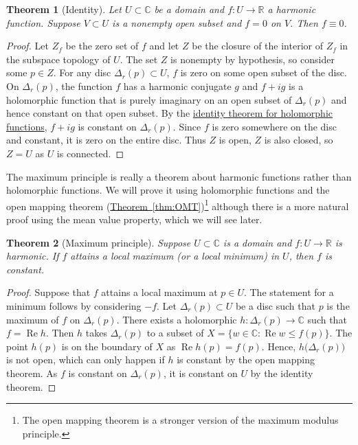\documentclass[12pt,openany]{book}
\renewcommand{\Re}{\operatorname{Re}}
\newcommand{\C}{{\mathbb{C}}}
\newcommand{\R}{{\mathbb{R}}}
\theoremstyle{plain}
\newtheorem{thm}{Theorem}[section]
\theoremstyle{remark}
\theoremstyle{definition}
\theoremstyle{exercise}
\theoremstyle{example}
\newcommand{\thmref}[1]{\hyperref[#1]{Theorem~\ref*{#1}}}
\begin{document}
\begin{thm}[Identity]
Let $U \subset \C$ be a domain and $f \colon U \to \R$ a harmonic function.
Suppose $V \subset U$ is a nonempty open subset and $f = 0$ on $V$.  Then $f
\equiv 0$.
\end{thm}

\begin{proof}
Let $Z_f$ be the zero set of $f$ and let $Z$ be the closure of the interior
of $Z_f$ in the subspace topology of $U$.
The set $Z$ is nonempty by hypothesis, so
consider some $p \in Z$.  For any disc $\Delta_r(p) \subset U$, $f$ is
zero on some open subset of the disc.  On $\Delta_r(p)$, the function
$f$ has a harmonic
conjugate $g$ and $f+i g$ is a holomorphic function that is purely imaginary on
an open subset of $\Delta_r(p)$ and hence constant on that open subset.
By the \hyperref[thm:identity]{identity theorem for holomorphic functions},
$f+ig$ is constant 
on $\Delta_r(p)$.
Since $f$ is zero somewhere on the
disc and constant, it is zero on the entire disc.  Thus $Z$
is open, $Z$ is also closed, so $Z=U$ as $U$ is connected.
\end{proof}

The maximum principle is really a theorem about harmonic functions rather
than holomorphic functions.  We will prove it using holomorphic functions
and the open mapping theorem (\thmref{thm:OMT})\footnote{%
The open mapping theorem is a stronger version of the maximum modulus principle.}
although there is a more natural proof using the mean value property,
which we will see later.

\begin{thm}[Maximum principle]
%
Suppose $U \subset \C$ is a domain and $f \colon U \to \R$
is harmonic.  If $f$ attains a local maximum (or a local minimum) in $U$, then $f$ is constant.
\end{thm}

\begin{proof}
Suppose that $f$ attains a local maximum at $p \in U$.
The statement for a minimum follows by considering $-f$.
Let $\Delta_r(p) \subset U$
be a disc such that $p$ is the maximum of $f$ on $\Delta_r(p)$.
There exists a holomorphic $h \colon \Delta_r(p) \to \C$
such that $f = \Re h$.
Then $h$ takes
$\Delta_r(p)$ to a subset of $X = \bigl\{ w \in \C : \Re w \leq f(p) \bigr\}$.
The point $h(p)$ is on the boundary of $X$ as $\Re h(p)= f(p)$.  Hence,
$h\bigl(\Delta_r(p)\bigr)$ is not open, which can only happen if $h$ is
constant by the open mapping theorem.  As $f$ is constant on $\Delta_r(p)$, it is constant on $U$ by the
identity theorem.
\end{proof}
\end{document}
